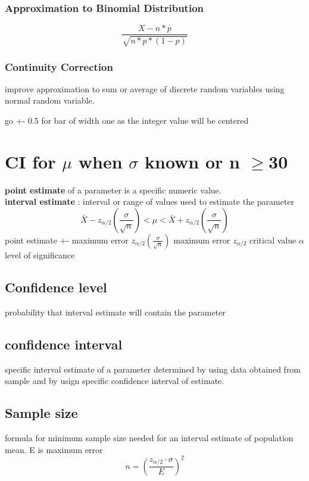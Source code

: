 \documentclass[11pt]{article}
\begin{document}
\subsubsection{Approximation to Binomial Distribution}
\begin{equation}
  \frac{X - n*p}{\sqrt{n*p*(1-p)}}
\end{equation}
\subsubsection{Continuity Correction}
\par improve approximation to sum or average of discrete random variables
using normal random variable.
\par go +- 0.5 for bar of width one as the integer value will be centered
\section{CI for $\mu$ when $\sigma $ known or n $\ge $30}
\textbf{point estimate} of a parameter is a specific numeric value.\\
\textbf{interval estimate} : interval or range of values used to estimate
the parameter
\begin{equation}
  \bar X - z_{\alpha/2}(\frac{\sigma}{\sqrt{n}}) < \mu < \bar X +z_{\alpha/2}(\frac{\sigma}{\sqrt{n}})
\end{equation}
point estimate +- maximum error
$z_{\alpha/2}(\frac{\sigma}{\sqrt{n}})$  maximum error
$z_{\alpha/2}$ critical value
$\alpha$ level of significance
\subsection{Confidence level}
\par probability that interval estimate will contain the parameter
\subsection{confidence interval}
\par specific interval estimate of a parameter determined by using data
obtained from sample and by usign specific confidence interval of
estimate.
\subsection{Sample size}
\par formula for minimum sample size needed for an interval estimate of
population mean. E is maximum error
\begin{equation}
  n=(\frac{z_{\alpha/2} \cdot \sigma}{E})^2
\end{equation}
\end{document}
